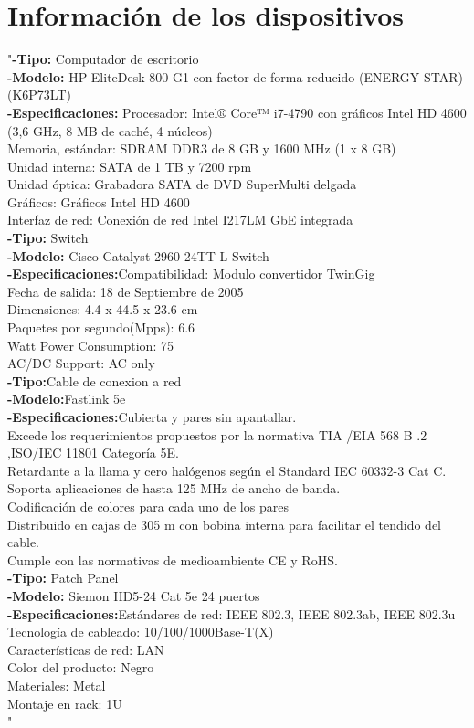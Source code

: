 \documentclass{udpreport}
\begin{document}
\section{Información de los dispositivos}
"{\bf-Tipo:} Computador de escritorio\\
{\bf-Modelo:}  HP EliteDesk 800 G1 con factor de forma reducido (ENERGY STAR)
(K6P73LT)\\
{\bf-Especificaciones:} Procesador:
Intel® Core™ i7-4790 con gráficos Intel HD 4600 (3,6 GHz, 8 MB de caché, 4 núcleos)\\
Memoria, estándar:
SDRAM DDR3 de 8 GB y 1600 MHz (1 x 8 GB)\\
Unidad interna:
SATA de 1 TB y 7200 rpm\\
Unidad óptica:
Grabadora SATA de DVD SuperMulti delgada\\
Gráficos:
Gráficos Intel HD 4600\\
Interfaz de red:
Conexión de red Intel I217LM GbE integrada\\
{\bf-Tipo:} Switch\\
{\bf-Modelo:} Cisco Catalyst 2960-24TT-L Switch\\
{\bf-Especificaciones:}Compatibilidad:
Modulo convertidor TwinGig\\
Fecha de salida:
18 de Septiembre de 2005\\
Dimensiones:
4.4 x 44.5 x 23.6 cm\\
Paquetes por segundo(Mpps):
6.6\\
Watt Power Consumption:	
75\\
AC/DC Support:
AC only\\
{\bf-Tipo:}Cable de conexion a red\\
{\bf-Modelo:}Fastlink 5e\\
{\bf-Especificaciones:}Cubierta y pares sin apantallar.\\
Excede los requerimientos propuestos por la normativa TIA /EIA 568 B .2 ,ISO/IEC 11801 Categoría 5E.\\
Retardante a la llama y cero halógenos según el Standard IEC 60332-3 Cat C.\\
Soporta aplicaciones de hasta 125 MHz de ancho de banda.\\
Codificación de colores para cada uno de los pares\\
Distribuido en cajas de 305 m con bobina interna para facilitar el tendido del cable.\\
Cumple con las normativas de medioambiente CE y RoHS.\\
{\bf-Tipo:} Patch Panel\\
{\bf-Modelo:} Siemon HD5-24 Cat 5e 24 puertos\\
{\bf-Especificaciones:}Estándares de red: IEEE 802.3, IEEE 802.3ab, IEEE 802.3u\\
Tecnología de cableado: 10/100/1000Base-T(X)\\
Características de red: LAN\\
Color del producto: Negro\\
Materiales: Metal\\
Montaje en rack: 1U\\"
\end{document}
